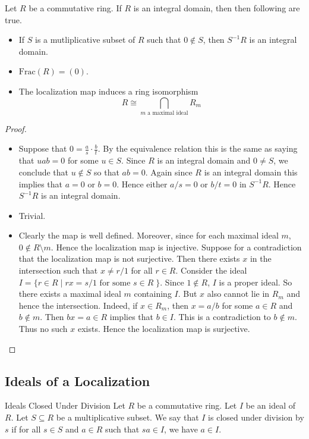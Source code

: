 \documentclass[a4paper]{article}
\begin{document}
\begin{lmm}{}{} Let $R$ be a commutative ring. If $R$ is an integral domain, then then following are true. 
\begin{itemize}
\item If $S$ is a mutliplicative subset of $R$ such that $0\notin S$, then $S^{-1}R$ is an integral domain. 
\item $\text{Frac}(R)=(0)$. 
\item The localization map induces a ring isomorphism $$R\cong\bigcap_{m\text{ a maximal ideal}}R_m$$
\end{itemize} \tcbline
\begin{proof}~\\
\begin{itemize}
\item Suppose that $0=\frac{a}{s}\cdot\frac{b}{t}$. By the equivalence relation this is the same as saying that $uab=0$ for some $u\in S$. Since $R$ is an integral domain and $0\neq S$, we conclude that $u\notin S$ so that $ab=0$. Again since $R$ is an integral domain this implies that $a=0$ or $b=0$. Hence either $a/s=0$ or $b/t=0$ in $S^{-1}R$. Hence $S^{-1}R$ is an integral domain. 
\item Trivial. 
\item Clearly the map is well defined. Moreover, since for each maximal ideal $m$, $0\notin R\setminus m$. Hence the localization map is injective. Suppose for a contradiction that the localization map is not surjective. Then there exists $x$ in the intersection such that $x\neq r/1$ for all $r\in R$.  Consider the ideal $I=\{r\in R\;|\;rx=s/1\text{ for some }s\in R\;\}$. Since $1\notin R$, $I$ is a proper ideal. So there exists a maximal ideal $m$ containing $I$. But $x$ also cannot lie in $R_m$ and hence the intersection. Indeed, if $x\in R_m$, then $x=a/b$ for some $a\in R$ and $b\notin m$. Then $bx=a\in R$ implies that $b\in I$. This is a contradiction to $b\notin m$. Thus no such $x$ exists. Hence the localization map is surjective. 
\end{itemize}
\end{proof}
\end{lmm}

\subsection{Ideals of a Localization}
\begin{defn}{Ideals Closed Under Division}{} Let $R$ be a commutative ring. Let $I$ be an ideal of $R$. Let $S\subseteq R$ be a multiplicative subset. We say that $I$ is closed under division by $s$ if for all $s\in S$ and $a\in R$ such that $sa\in I$, we have $a\in I$. 
\end{defn}
\end{document}
